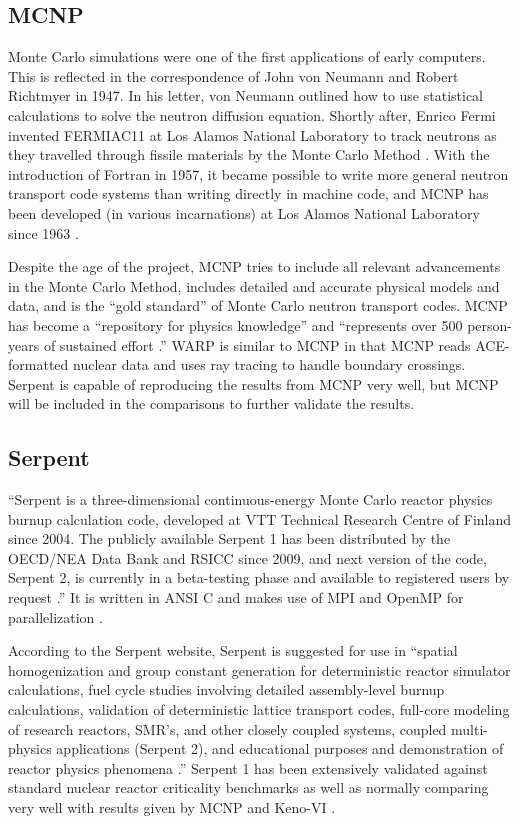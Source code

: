 \subsection{MCNP}

Monte Carlo simulations were one of the first applications of early computers.   This is reflected in the correspondence of John von Neumann and  Robert Richtmyer  in 1947.  In his letter, von Neumann outlined how to use statistical calculations to solve the neutron diffusion equation.  Shortly after, Enrico Fermi invented FERMIAC11 at Los Alamos National Laboratory to track neutrons as they travelled through fissile materials by the Monte Carlo Method \cite{mcnp}.  With the introduction of Fortran in 1957, it became possible to write more general neutron transport code systems than writing directly in machine code, and MCNP has been developed (in various incarnations) at Los Alamos National Laboratory since 1963 \cite{mcnp}.
 
Despite the age of the project, MCNP tries to include all relevant advancements in the Monte Carlo Method, includes detailed and accurate physical models and data, and is the ``gold standard'' of Monte Carlo neutron transport codes.  MCNP has become a ``repository for physics knowledge'' and ``represents over 500 person-years of sustained effort \cite{mcnp}.''   WARP is similar to MCNP in that MCNP reads ACE-formatted nuclear data and uses ray tracing to handle boundary crossings.  Serpent is capable of reproducing the results from MCNP very well, but MCNP will be included in the comparisons to further validate the results.

\subsection{Serpent}

``Serpent is a three-dimensional continuous-energy Monte Carlo reactor physics burnup calculation code, developed at VTT Technical Research Centre of Finland since 2004. The publicly available Serpent 1 has been distributed by the OECD/NEA Data Bank and RSICC since 2009, and next version of the code, Serpent 2, is currently in a beta-testing phase and available to registered users by request \cite{serpent}.''  It is written in ANSI C and makes use of MPI and OpenMP for parallelization \cite{jaakko}.

 According to the Serpent website, Serpent is suggested for use in ``spatial homogenization and group constant generation for deterministic reactor simulator calculations, fuel cycle studies involving detailed assembly-level burnup calculations, validation of deterministic lattice transport codes, full-core modeling of research reactors, SMR's, and other closely coupled systems, coupled multi-physics applications (Serpent 2),  and educational purposes and demonstration of reactor physics phenomena \cite{serpent}.''  Serpent 1 has been extensively validated against standard nuclear reactor criticality benchmarks as well as normally comparing very well with results given by MCNP and Keno-VI \cite{serpent}.

